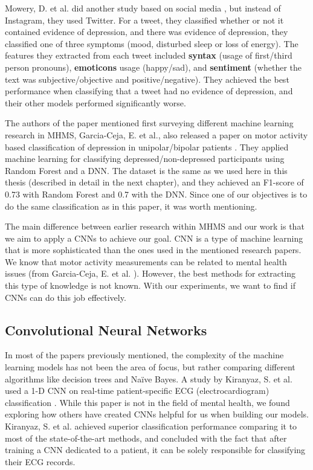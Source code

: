 Mowery, D. et al. did another study based on social media \cite{twitter_depression}, but instead of Instagram, they used Twitter. For a tweet, they classified whether or not it contained evidence of depression, and there was evidence of depression, they classified one of three symptoms (mood, disturbed sleep or loss of energy). The features they extracted from each tweet included \textbf{syntax} (usage of first/third person pronouns), \textbf{emoticons} usage (happy/sad), and \textbf{sentiment} (whether the text was subjective/objective and positive/negative). They achieved the best performance when classifying that a tweet had no evidence of depression, and their other models performed significantly worse. 

The authors of the paper mentioned first surveying different machine learning research in MHMS, Garcia-Ceja, E. et al., also released a paper on motor activity based classification of depression in unipolar/bipolar patients \cite{GarciaCeja2018_classification_bipolar}. They applied machine learning for classifying depressed/non-depressed participants using Random Forest and a DNN. The dataset is the same as we used here in this thesis (described in detail in the next chapter), and they achieved an F1-score of 0.73 with Random Forest and 0.7 with the DNN. Since one of our objectives is to do the same classification as in this paper, it was worth mentioning.

The main difference between earlier research within MHMS and our work is that we aim to apply a CNNs to achieve our goal. CNN is a type of machine learning that is more sophisticated than the ones used in the mentioned research papers. We know that motor activity measurements can be related to mental health issues (from Garcia-Ceja, E. et al. \cite{GarciaCeja2018_classification_bipolar}). However, the best methods for extracting this type of knowledge is not known. With our experiments, we want to find if CNNs can do this job effectively.

\subsection{Convolutional Neural Networks}

In most of the papers previously mentioned, the complexity of the machine learning models has not been the area of focus, but rather comparing different algorithms like decision trees and Naïve Bayes. A study by Kiranyaz, S. et al. used a 1-D CNN on real-time patient-specific ECG (electrocardiogram) classification \cite{ecg_1d_conv}. While this paper is not in the field of mental health, we found exploring how others have created CNNs helpful for us when building our models. Kiranyaz, S. et al. achieved superior classification performance comparing it to most of the state-of-the-art methods, and concluded with the fact that after training a CNN dedicated to a patient, it can be solely responsible for classifying their ECG records.

